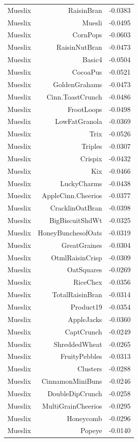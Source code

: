 \begin{longtable}{@{}lrr@{}}
Mueslix & RaisinBran & -0.0383 \\
Mueslix & Muesli & -0.0495 \\
Mueslix & CornPops & -0.0603 \\
Mueslix & RaisinNutBran & -0.0473 \\
Mueslix & Basic4 & -0.0504 \\
Mueslix & CocoaPus & -0.0521 \\
Mueslix & GoldenGrahams & -0.0473 \\
Mueslix & Cinn.ToastCrunch & -0.0486 \\
Mueslix & FrootLoops & -0.0498 \\
Mueslix & LowFatGranola & -0.0369 \\
Mueslix & Trix & -0.0526 \\
Mueslix & Triples & -0.0307 \\
Mueslix & Crispix & -0.0432 \\
Mueslix & Kix & -0.0466 \\
Mueslix & LuckyCharms & -0.0438 \\
Mueslix & AppleCinn.Cheerios & -0.0377 \\
Mueslix & CracklinOatBran & -0.0398 \\
Mueslix & BigBiscuitShdWt & -0.0325 \\
Mueslix & HoneyBunchesofOats & -0.0319 \\
Mueslix & GreatGraines & -0.0304 \\
Mueslix & OtmlRaisinCrisp & -0.0309 \\
Mueslix & OatSquares & -0.0269 \\
Mueslix & RiceChex & -0.0356 \\
Mueslix & TotalRaisinBran & -0.0314 \\
Mueslix & Product19 & -0.0354 \\
Mueslix & AppleJacks & -0.0360 \\
Mueslix & CaptCrunch & -0.0249 \\
Mueslix & ShreddedWheat & -0.0265 \\
Mueslix & FruityPebbles & -0.0313 \\
Mueslix & Clusters & -0.0288 \\
Mueslix & CinnamonMiniBuns & -0.0246 \\
Mueslix & DoubleDipCrunch & -0.0258 \\
Mueslix & MultiGrainCheerios & -0.0295 \\
Mueslix & Honeycomb & -0.0296 \\
Mueslix & Popeye & -0.0140 \\

\end{longtable}
